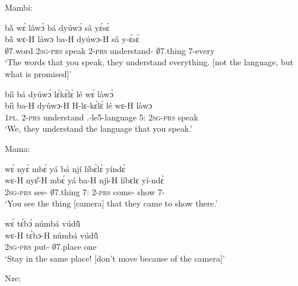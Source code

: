 \noindent Mambi:

\begin{exe}[(C234)]  
\exC\label{211} 
  \glll bã̀ wɛ́ làwɔ̀ bá dyúwɔ́ sâ yɛ́sɛ̀\\
         bã̀ wɛ-H làwɔ ba-H dyúwɔ-H sâ y-ɛ́sɛ̀ \\
         $\emptyset$7.word 2\textsc{sg}-\textsc{prs} speak 2-\textsc{prs} understand-{\R} $\emptyset$7.thing 7-every\\
    \trans `The words that you speak, they understand everything. [not the language, but what is promised]'
 
\exC\label{212} 
  \glll bíì bá dyúwɔ́ lɛ́kɛ́lɛ̀ lé wɛ́ làwɔ̀\\
        bíì ba-H dyúwɔ-H H-lɛ-kɛ́lɛ̀ lé wɛ-H làwɔ\\
         1\textsc{pl}.{\SBJ}  2-\textsc{prs} understand {\OBJ}.{\LINK}-le5-language 5:{\ATT}  2\textsc{sg}-\textsc{prs} speak\\
    \trans `We, they understand the language that you speak.'
\end{exe}

\noindent Mama:

\begin{exe}[(C234)] 
\exC\label{213} 
  \glll wɛ́ nyɛ́ mbɛ́ yá bá njí líbɛ̀lɛ̀ yíndɛ̀ \\
        wɛ-H nyɛ̂-H mbɛ́ yá ba-H njì-H líbɛlɛ yí-ndɛ̀ \\
        2\textsc{sg}-\textsc{prs} see-{\R} $\emptyset$7.thing 7:{\ATT}  2-\textsc{prs} come-{\R} show 7-{\ANA}  \\
    \trans `You see the thing [camera] that they came to show there.'
 
\exC\label{214}
  \glll wɛ́ tɛ́bɔ́ númbá vúdũ̂ \\
       wɛ-H tɛ́bɔ-H númbá vúdũ̂ \\
        2\textsc{sg}-\textsc{prs} put-{\R} $\emptyset$7.place one  \\
    \trans `Stay in the same place! [don't move because of the camera]'
\end{exe}

\noindent Nze:


